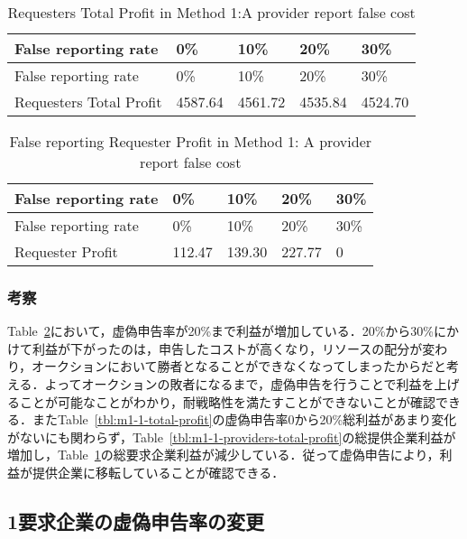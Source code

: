\hypertarget{tbl:m1-1-requesters-total-profit}{}
\begin{longtable}[H]{@{}lllll@{}}
\caption{\label{tbl:m1-1-requesters-total-profit}Requesters Total Profit
in Method 1:A provider report false cost}\tabularnewline
\toprule
False reporting rate & 0\% & 10\% & 20\% & 30\%\tabularnewline
\midrule
\endfirsthead
\toprule
False reporting rate & 0\% & 10\% & 20\% & 30\%\tabularnewline
\midrule
\endhead
Requesters Total Profit & 4587.64 & 4561.72 & 4535.84 &
4524.70\tabularnewline
\bottomrule
\end{longtable}

\hypertarget{tbl:m1-1-false-requester-total-profit}{}
\begin{longtable}[H]{@{}lllll@{}}
\caption{\label{tbl:m1-1-false-requester-total-profit}False reporting
Requester Profit in Method 1: A provider report false
cost}\tabularnewline
\toprule
False reporting rate & 0\% & 10\% & 20\% & 30\%\tabularnewline
\midrule
\endfirsthead
\toprule
False reporting rate & 0\% & 10\% & 20\% & 30\%\tabularnewline
\midrule
\endhead
Requester Profit & 112.47 & 139.30 & 227.77 & 0\tabularnewline
\bottomrule
\end{longtable}

\hypertarget{ux8003ux5bdf}{%
\subsubsection{考察}\label{ux8003ux5bdf}}

Table~\ref{tbl:m1-1-false-requester-total-profit}において，虚偽申告率が20\%まで利益が増加している．20\%から30\%にかけて利益が下がったのは，申告したコストが高くなり，リソースの配分が変わり，オークションにおいて勝者となることができなくなってしまったからだと考える．よってオークションの敗者になるまで，虚偽申告を行うことで利益を上げることが可能なことがわかり，耐戦略性を満たすことができないことが確認できる．またTable~\ref{tbl:m1-1-total-profit}の虚偽申告率0から20\%総利益があまり変化がないにも関わらず，Table~\ref{tbl:m1-1-providers-total-profit}の総提供企業利益が増加し，Table~\ref{tbl:m1-1-requesters-total-profit}の総要求企業利益が減少している．従って虚偽申告により，利益が提供企業に移転していることが確認できる．

\hypertarget{ux8981ux6c42ux4f01ux696dux306eux865aux507dux7533ux544aux7387ux306eux5909ux66f4}{%
\subsection{1要求企業の虚偽申告率の変更}\label{ux8981ux6c42ux4f01ux696dux306eux865aux507dux7533ux544aux7387ux306eux5909ux66f4}}

